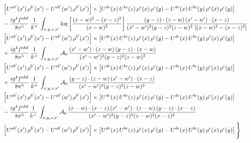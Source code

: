 \documentclass[9pt]{article}
\numberwithin{equation}{section}
\begin{document}
\begin{align}
& \left[U^{ab'}(x')\,\rho^{b'}(x')-U^{ab'}(w')\, \rho^{b'}(x')\right]\times \left[U^{de}(x)\,U^{bc}(z)\, \rho^{e}(x)\,\rho^{c}(y)-U^{de}(x)\,U^{bc}(y)\,\rho^{e}(x)\,\rho^{c}(y)\right] \notag \\
& -\frac{ig^{4}f^{abd}}{8\pi^{5}}\,\frac{1}{k^{+}}\,\int_{x,y,z,x'}\log{\left[\frac{(x-w)^{2}-(x-z)^{2}}{(x-w)^{2}}\right]}\,
\frac{(y-z)\cdot(z-w)\,(x'-w')\cdot(x-z)}{(x'-w')^{2}(y-z)^{2}(z-w)^{2}\,\left[(x-w)^{2}-(x-z)^{2}\right]}\notag \\ & \left[U^{ab'}(x')\,\rho^{b'}(x')-U^{ab'}(w')\, \rho^{b'}(x')\right]\times \left[U^{de}(x)\,U^{bc}(z)\, \rho^{e}(x)\,\rho^{c}(y)-U^{de}(x)\,U^{bc}(y)\,\rho^{e}(x)\,\rho^{c}(y)\right] \notag \\
& +\frac{ig^{4}f^{abd}}{8\pi^{5}}\,\frac{1}{k^{+}}\,\int_{x,y,z,x'}\mathcal{A}_{0}\,
\frac{(x'-w')\cdot(z-w)\,(y-z)\cdot(x-w)}{(x'-w')^{2}(y-z)^{2}(z-w)^{2}}\notag \\
& \left[U^{ab'}(x')\,\rho^{b'}(x')-U^{ab'}(w')\, \rho^{b'}(x')\right]\times \left[U^{de}(x)\,U^{bc}(z)\, \rho^{e}(x)\,\rho^{c}(y)-U^{de}(x)\,U^{bc}(y)\,\rho^{e}(x)\,\rho^{c}(y)\right] \notag \\
& +\frac{ig^{4}f^{abd}}{8\pi^{5}}\,\frac{1}{k^{+}}\,\int_{x,y,z,x'}\mathcal{A}_{0}\,
\frac{(y-z)\cdot(z-w)\,(x'-w')\cdot(x-z)}{(x'-w')^{2}(y-z)^{2}(z-w)^{2}}\notag \\ & \left[U^{ab'}(x')\,\rho^{b'}(x')-U^{ab'}(w')\, \rho^{b'}(x')\right]\times \left[U^{de}(x)\,U^{bc}(z)\, \rho^{e}(x)\,\rho^{c}(y)-U^{de}(x)\,U^{bc}(y)\,\rho^{e}(x)\,\rho^{c}(y)\right] \notag \\
& -\frac{ig^{4}f^{abd}}{8\pi^{5}}\frac{1}{k^{+}}\,\int_{x,y,z,x'}\mathcal{A}_{0}\,
\frac{(x-w)\cdot(x-z)\,(x'-w')\cdot(z-w)\,(y-z)\cdot(x-z)}{(x'-w')^{2}(y-z)^{2}(z-w)^{2}(x-z)^{2}}\notag \\ & \left[U^{ab'}(x')\,\rho^{b'}(x')-U^{ab'}(w')\, \rho^{b'}(x')\right]\times \left[U^{de}(x)\,U^{bc}(z)\, \rho^{e}(x)\,\rho^{c}(y)-U^{de}(x)\,U^{bc}(y)\,\rho^{e}(x)\,\rho^{c}(y)\right]\Bigg\}
\end{align}
\end{document}
